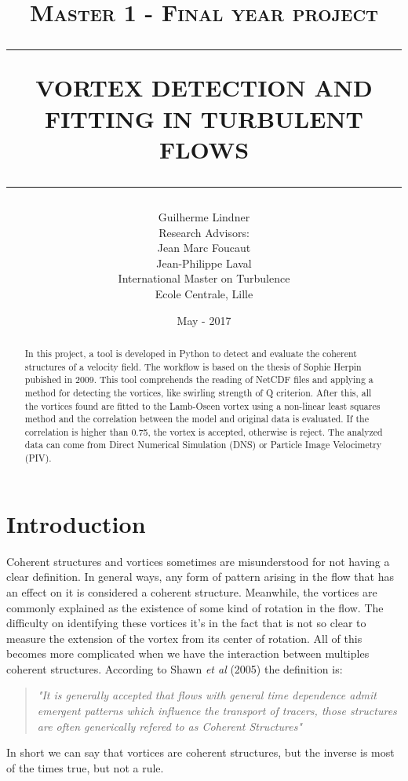 \documentclass[12pt, a4paper, openany]{memoir}
\title{ \normalsize \textsc{Master 1 - Final year project}
	\\ [2.0cm]
	\hrule
	\vspace{0.5cm}
	\LARGE \textbf{\uppercase{Vortex detection and fitting in turbulent flows}} \\ [0.5cm]
	\hrule
	\vspace{0.5cm}
	\normalsize  \vspace*{5\baselineskip}}
\date{\vfill May - 2017}
\author{
	\Large Guilherme Lindner \\ [1.0cm]
	Research Advisors: \\
	Jean Marc Foucaut \\
	Jean-Philippe Laval  \\ [1.0cm]
	International Master on Turbulence\\ [0.2cm]
	Ecole Centrale, Lille \\}
\begin{document}
	
	\maketitle
	\thispagestyle{empty}
	\let\cleardoublepage\clearpage
	\frontmatter
	\begin{abstract}
		In this project, a tool is developed in Python to detect and evaluate the coherent structures of a velocity field. The workflow is based on the thesis of Sophie Herpin \cite{herpin2009} pubished in 2009.
		This tool comprehends the reading of NetCDF files and applying a method for detecting the vortices, like swirling strength of Q criterion. After this, all the vortices found are fitted to the Lamb-Oseen vortex using a non-linear least squares method and the correlation between the model and original data is evaluated. If the correlation is higher than 0.75, the vortex is accepted, otherwise is reject. The analyzed data can come from Direct Numerical Simulation (DNS) or Particle Image Velocimetry (PIV).
	\end{abstract}
	\newpage
	\tableofcontents
	\newpage
	\listoftables
	\newpage
	\listoffigures

    \mainmatter

\chapter*{Introduction}
Coherent structures and vortices sometimes are misunderstood for not having a clear definition. In general ways, any form of pattern arising in the flow that has an effect on it is considered a coherent structure. Meanwhile, the vortices are commonly explained as the existence of some kind of rotation in the flow. The difficulty on identifying these vortices it's in the fact that is not so clear to measure the extension of the vortex from its center of rotation. All of this becomes more complicated when we have the interaction between multiples coherent structures. According to Shawn \textit{et al} (2005) \cite{shawn2005} the definition is:
\begin{quote}
	\textit{"It is generally accepted that flows with general time dependence admit emergent patterns which influence the transport of tracers, those structures are often generically refered to as Coherent Structures"}
\end{quote}

In short we can say that vortices are coherent structures, but the inverse is most of the times true, but not a rule.
\end{document}
